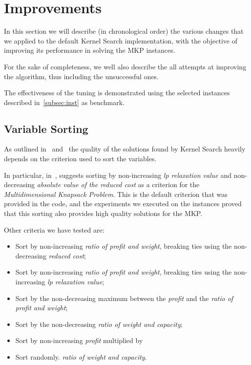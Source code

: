 \chapter{Improvements}\label{ch:improvements}
In this section we will describe (in chronological order) the various changes
that we applied to the default Kernel Search implementation,
with the objective of improving its performance
in solving the MKP instances.

For the sake of completeness, we well also describe the all attempts at improving
the algorithm, thus including the unsuccessful ones.

The effectiveness of the tuning is demonstrated using the selected instances
described in~\ref{subsec:inst} as benchmark.


\section{Variable Sorting}
As outlined in~\cite{kernel:2010} and~\cite{kernel:2012} the quality of
the solutions found by Kernel Search heavily depends on the criterion used to sort the variables.

In particular, in~\cite{kernel:2010}, suggests
sorting by non-increasing \textit{lp relaxation value} and non-decreasing \textit{absolute value of the reduced cost}
as a criterion for the \textit{Multidimensional Knapsack Problem}.
This is the default criterion that was provided in the code, and
the experiments we executed on the instances proved that this sorting also
provides high quality solutions for the MKP\@.

Other criteria we have tested are:
\begin{itemize}
    \item Sort by non-increasing \textit{ratio of profit and weight},
    breaking ties using the non-decreasing \textit{reduced cost};
    \item Sort by non-increasing \textit{ratio of profit and weight},
    breaking ties using the non-increasing \textit{lp relaxation value};
    \item Sort by the non-decreasing maximum between the \textit{profit}
    and the \textit{ratio of profit and weight};
    \item Sort by the non-decreasing \textit{ratio of weight and capacity};
    \item Sort by non-increasing \textit{profit} multiplied by
    \item Sort randomly.
    \textit{ratio of weight and capacity}.
\end{itemize}


